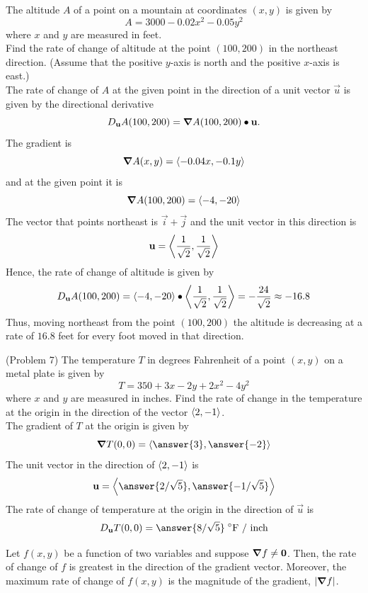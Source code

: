 \documentclass[handout]{ximera}
\begin{document}
\begin{example}[Example 7]
The altitude $A$ of a point on a mountain at coordinates $(x, y)$ is given by
\[
A = 3000 - 0.02x^2 - 0.05y^2
\]
where $x$ and $y$ are measured in feet.\\
Find the rate of change of altitude at the point $(100, 200)$ in the northeast direction. 
(Assume that the positive $y$-axis is north and the positive $x$-axis is east.)\\
The rate of change of $A$ at the given point in the direction of a unit 
vector $\vec u$ is given by the directional derivative
\[
D_{\mathbf u} A(100, 200) = \boldsymbol\nabla A(100,200) \bullet \mathbf u.
\]
The gradient is
\[
\boldsymbol\nabla A(x,y) = \left\langle -0.04x, -0.1y\right\rangle
\]
and at the given point it is
\[
\boldsymbol\nabla A(100,200) = \left\langle -4, -20\right\rangle
\]
The vector that points northeast is $\vec i  + \vec j$ and the unit 
vector in this direction is
\[
\mathbf u = \left\langle \frac{1}{\sqrt 2}, \frac{1}{\sqrt 2}\right\rangle
\]
Hence, the rate of change of altitude is given by
\[
D_{\mathbf u} A(100, 200) = \left\langle -4, -20\right\rangle \bullet 
\left\langle \frac{1}{\sqrt 2}, \frac{1}{\sqrt 2}\right\rangle = -\frac{24}{\sqrt 2} \approx -16.8
\]
Thus, moving northeast from the point $(100, 200)$ the altitude is decreasing at a rate of 
$16.8$ feet for every foot moved in that direction.
\end{example}

\begin{problem}(Problem 7)
The temperature $T$ in degrees Fahrenheit of a point $(x,y)$ on a metal plate is given by 
\[
T = 350 + 3x - 2y + 2x^2 - 4y^2
\]
where $x$ and $y$ are measured in inches.  Find the rate of change in the 
temperature at the origin in the direction of the vector $\left\langle 2,-1\right\rangle$.\\
The gradient of $T$ at the origin is given by
\[
\grad T(0,0) = \vector{\answer{3}, \answer{-2}}
\]
The unit vector in the direction of $\left\langle 2, -1\right\rangle$ is
\[
\vec u = \vector{\answer{2/\sqrt 5}, \answer{-1/\sqrt 5}}
\]
The rate of change of temperature at the origin in the direction of $\vec u$ is
\[
D_{\vec u} T(0,0) = \answer{8/ \sqrt 5} \; ^\circ \text{F / inch}
\]
\end{problem}



\begin{proposition}
Let $f(x,y)$ be a function of two variables and suppose $\boldsymbol\nabla f \neq \mathbf 0$. 
Then, the rate of change of $f$ is greatest in the direction of the gradient vector.
Moreover, the maximum rate of change of $f(x,y)$ is the magnitude of the 
gradient, $|\boldsymbol\nabla f|$.

\end{proposition}
\end{document}
